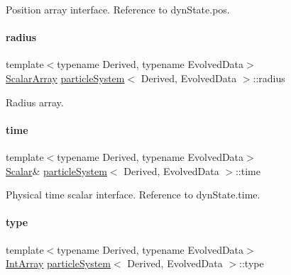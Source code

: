 Position array interface. Reference to dyn\+State.\+pos. 

\mbox{\label{classparticle_system_a8f1ca1c5c748549b9b1fc57cb9bd01a0}} 
\paragraph{\texorpdfstring{radius}{radius}}
{\footnotesize\ttfamily template$<$typename Derived, typename Evolved\+Data$>$ \\
\mbox{\hyperlink{classparticle_system_af7f328120ff85c8b34edeed4a68b746e}{Scalar\+Array}} \mbox{\hyperlink{classparticle_system}{particle\+System}}$<$ Derived, Evolved\+Data $>$\+::radius}



Radius array. 

\mbox{\label{classparticle_system_a2edb9719905f209d84079450c1a01280}} 
\paragraph{\texorpdfstring{time}{time}}
{\footnotesize\ttfamily template$<$typename Derived, typename Evolved\+Data$>$ \\
\mbox{\hyperlink{classparticle_system_a28e49da72c0ca5786d0611e6128a8994}{Scalar}}\& \mbox{\hyperlink{classparticle_system}{particle\+System}}$<$ Derived, Evolved\+Data $>$\+::time}



Physical time scalar interface. Reference to dyn\+State.\+time. 

\mbox{\label{classparticle_system_afafaf8f74705b4f569be8d7e4d78aa4f}} 
\paragraph{\texorpdfstring{type}{type}}
{\footnotesize\ttfamily template$<$typename Derived, typename Evolved\+Data$>$ \\
\mbox{\hyperlink{classparticle_system_aee9dc82f46ce17a477251805094cf19f}{Int\+Array}} \mbox{\hyperlink{classparticle_system}{particle\+System}}$<$ Derived, Evolved\+Data $>$\+::type}



